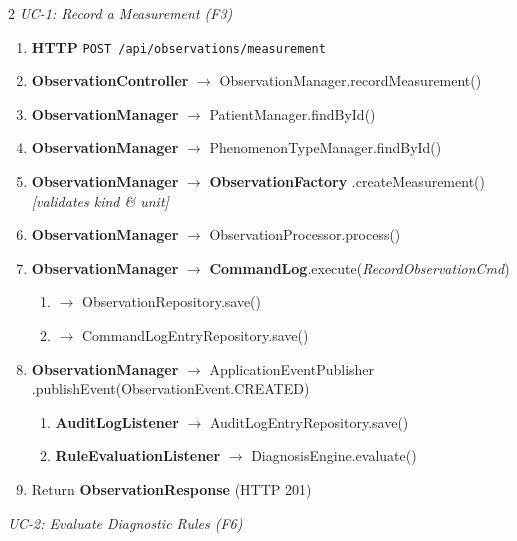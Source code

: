 \documentclass[9pt]{article}
\begin{document}
\setlength{\multicolsep}{0pt}
\begin{multicols}{2}
\noindent\textit{\small UC-1: Record a Measurement (F3)}
\vspace{2pt}

\begin{enumerate}[leftmargin=1.4em, label=\textbf{\arabic*.}, font=\scriptsize\bfseries,
                  itemsep=2pt, topsep=0pt]
  \scriptsize
  \item \textbf{HTTP} \texttt{POST /api/observations/measurement}
  \item \textbf{ObservationController} $\rightarrow$ ObservationManager.recordMeasurement()
  \item \textbf{ObservationManager} $\rightarrow$ PatientManager.findById()
  \item \textbf{ObservationManager} $\rightarrow$ PhenomenonTypeManager.findById()
  \item \textbf{ObservationManager} $\rightarrow$ \textbf{ObservationFactory}\newline
        .createMeasurement() \quad\textit{[validates kind \& unit]}
  \item \textbf{ObservationManager} $\rightarrow$ ObservationProcessor.process()
  \item \textbf{ObservationManager} $\rightarrow$ \textbf{CommandLog}.execute(\textit{RecordObservationCmd})
        \begin{enumerate}
          \scriptsize
          \item $\rightarrow$ ObservationRepository.save()
          \item $\rightarrow$ CommandLogEntryRepository.save()
        \end{enumerate}
  \item \textbf{ObservationManager} $\rightarrow$ ApplicationEventPublisher\newline
        .publishEvent(ObservationEvent.CREATED)
        \begin{enumerate}
          \scriptsize
          \item \textbf{AuditLogListener} $\rightarrow$ AuditLogEntryRepository.save()
          \item \textbf{RuleEvaluationListener} $\rightarrow$ DiagnosisEngine.evaluate()
        \end{enumerate}
  \item Return \textbf{ObservationResponse} (HTTP 201)
\end{enumerate}

\columnbreak
\noindent\textit{\small UC-2: Evaluate Diagnostic Rules (F6)}
\vspace{2pt}


\end{multicols}
\end{document}
